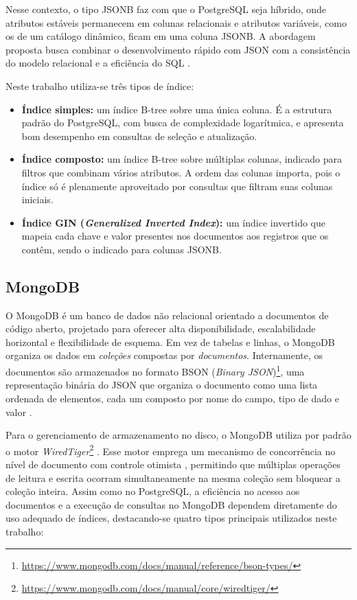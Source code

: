 Nesse contexto, o tipo JSONB faz com que o PostgreSQL seja híbrido, onde atributos estáveis
permanecem em colunas relacionais e atributos variáveis, como os de um catálogo
dinâmico, ficam em uma coluna JSONB. A abordagem proposta busca combinar o desenvolvimento rápido com JSON com a consistência do modelo relacional e a eficiência do SQL
\cite{Irshad2019}.

Neste trabalho utiliza-se três tipos de índice:

\begin{itemize}
    \item \textbf{Índice simples:} um índice B-tree sobre uma única coluna. É a estrutura
    padrão do PostgreSQL, com busca de complexidade logarítmica, e apresenta bom
    desempenho em consultas de seleção e atualização.
    \item \textbf{Índice composto:} um índice B-tree sobre múltiplas colunas, indicado
    para filtros que combinam vários atributos. A ordem das colunas
    importa, pois o índice só é plenamente aproveitado por consultas que filtram suas
    colunas iniciais.
    \item \textbf{Índice GIN (\textit{Generalized Inverted Index}):} um índice invertido
    que mapeia cada chave e valor presentes nos documentos aos registros que os contêm,
    sendo o indicado para colunas JSONB.
\end{itemize}

\subsection{MongoDB}

O MongoDB é um banco de dados não relacional orientado a documentos de código aberto, projetado para oferecer alta disponibilidade, escalabilidade horizontal 
e flexibilidade de esquema. Em vez de tabelas e linhas, o MongoDB organiza os dados em \textit{coleções} compostas por \textit{documentos}. Internamente, os documentos 
são armazenados no formato BSON (\textit{Binary JSON})\footnote{\url{https://www.mongodb.com/docs/manual/reference/bson-types/}}, uma representação binária do JSON que organiza o documento como uma lista ordenada de elementos,
cada um composto por nome do campo, tipo de dado e valor \cite{Truica2013}.

Para o gerenciamento de armazenamento no disco, o MongoDB utiliza por padrão o motor
\textit{WiredTiger}\footnote{\url{https://www.mongodb.com/docs/manual/core/wiredtiger/}} \cite{Nguyen2016}. Esse motor emprega um mecanismo de concorrência no nível de documento
com controle otimista \cite{MongoDBConcurrency}, permitindo que múltiplas operações de
leitura e escrita ocorram simultaneamente na mesma coleção sem bloquear a coleção inteira.
Assim como no PostgreSQL, a eficiência no acesso aos documentos e a execução de consultas no MongoDB dependem diretamente do uso adequado de índices, 
destacando-se quatro tipos principais utilizados neste trabalho:

